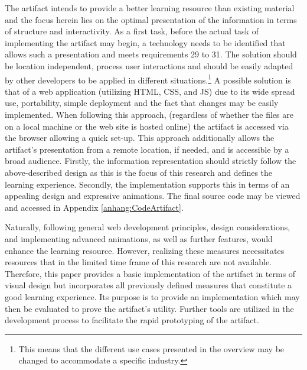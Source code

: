The artifact intends to provide a better learning resource than existing material and the focus herein lies on the optimal presentation of the information in terms of structure and interactivity. As a first task, before the actual task of implementing the artifact may begin, a technology needs to be identified that allows such a presentation and meets requirements 29 to 31. The solution should be location independent, process user interactions and should be easily adapted by other developers to be applied in different situations.\footnote{This means that the different use cases presented in the overview may be changed to accommodate a specific industry.} A possible solution is that of a web application (utilizing \ac{HTML}, \ac{CSS}, and \ac{JS}) due to its wide spread use, portability, simple deployment and the fact that changes may be easily implemented. When following this approach, (regardless of whether the files are on a local machine or the web site is hosted online) the artifact is accessed via the browser allowing a quick set-up. This approach additionally allows the artifact's presentation from a remote location, if needed, and is accessible by a broad audience. Firstly, the information representation should strictly follow the above-described design as this is the focus of this research and defines the learning experience. Secondly, the implementation supports this in terms of an appealing design and expressive animations. The final source code may be viewed and accessed in Appendix \ref{anhang:CodeArtifact}.

Naturally, following general web development principles, design considerations, and implementing advanced animations, as well as further features, would enhance the learning resource. However, realizing these measures necessitates resources that in the limited time frame of this research are not available. Therefore, this paper provides a basic implementation of the artifact in terms of visual design but incorporates all previously defined measures that constitute a good learning experience. Its purpose is to provide an implementation which may then be evaluated to prove the artifact's utility. Further tools are utilized in the development process to facilitate the rapid prototyping of the artifact.


